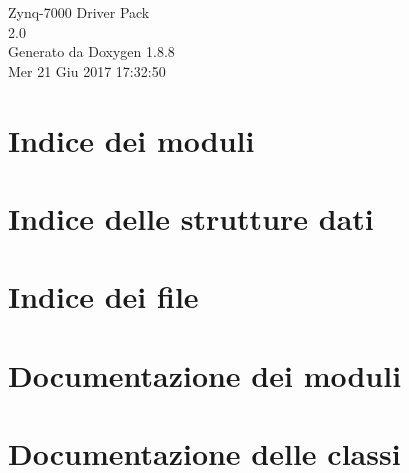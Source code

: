 \documentclass[twoside]{book}
\newcommand{\+}{\discretionary{\mbox{\scriptsize$\hookleftarrow$}}{}{}}
\newcommand{\clearemptydoublepage}{%
  \newpage{\pagestyle{empty}\cleardoublepage}%
}
\begin{document}
\hypersetup{pageanchor=false,
             bookmarks=true,
             bookmarksnumbered=true,
             pdfencoding=unicode
            }
\begin{titlepage}
\vspace*{7cm}
\begin{center}%
{\Large Zynq-\/7000 Driver Pack \\[1ex]\large 2.\+0 }\\
\vspace*{1cm}
{\large Generato da Doxygen 1.8.8}\\
\vspace*{0.5cm}
{\small Mer 21 Giu 2017 17:32:50}\\
\end{center}
\end{titlepage}
\clearemptydoublepage
\tableofcontents
\clearemptydoublepage
{}
\hypersetup{pageanchor=true}

\chapter{Indice dei moduli}

\chapter{Indice delle strutture dati}

\chapter{Indice dei file}

\chapter{Documentazione dei moduli}

















\chapter{Documentazione delle classi}







\end{document}
